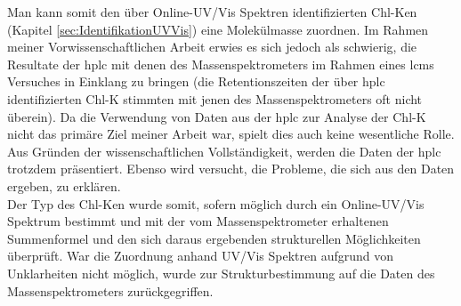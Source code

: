 Man kann somit den über Online-UV/Vis Spektren identifizierten \gls{Chl-K}en (Kapitel \ref{sec:IdentifikationUVVis}) eine Molekülmasse zuordnen. Im Rahmen meiner Vorwissenschaftlichen Arbeit erwies es sich jedoch als schwierig, die Resultate der \gls{hplc} mit denen des Massenspektrometers im Rahmen eines \gls{lcms} Versuches in Einklang zu bringen (die Retentionszeiten der über \gls{hplc} identifizierten \gls{Chl-K} stimmten mit jenen des Massenspektrometers oft nicht überein). Da die Verwendung von Daten aus der \gls{hplc} zur Analyse der \gls{Chl-K} nicht das primäre Ziel meiner Arbeit war, spielt dies auch keine wesentliche Rolle. Aus Gründen der wissenschaftlichen Vollständigkeit, werden die Daten der \gls{hplc} trotzdem präsentiert. Ebenso wird versucht, die Probleme, die sich aus den Daten ergeben, zu erklären.\\

Der Typ des \gls{Chl-K}en wurde somit, sofern möglich durch ein Online-UV/Vis Spektrum bestimmt und mit der vom Massenspektrometer erhaltenen Summenformel und den sich daraus ergebenden strukturellen Möglichkeiten überprüft. War die Zuordnung anhand UV/Vis Spektren aufgrund von Unklarheiten nicht möglich, wurde zur Strukturbestimmung auf die Daten des Massenspektrometers zurückgegriffen.\\



